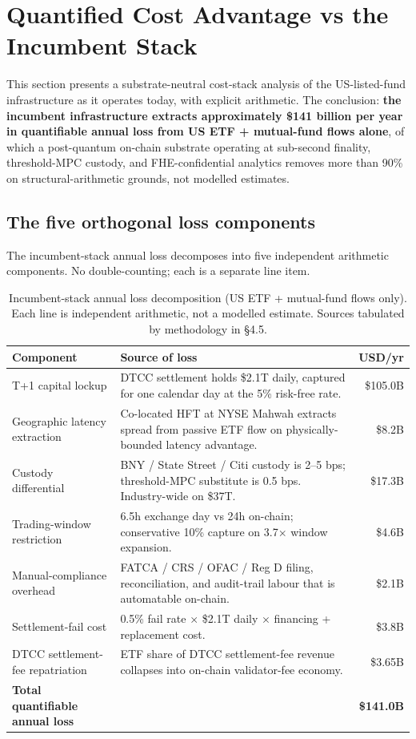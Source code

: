 \section{Quantified Cost Advantage vs the Incumbent Stack}

This section presents a substrate-neutral cost-stack analysis of the
US-listed-fund infrastructure as it operates today, with explicit
arithmetic. The conclusion: \textbf{the incumbent infrastructure
extracts approximately \$141 billion per year in quantifiable annual
loss from US ETF + mutual-fund flows alone}, of which a post-quantum
on-chain substrate operating at sub-second finality, threshold-MPC
custody, and FHE-confidential analytics removes more than 90\% on
structural-arithmetic grounds, not modelled estimates.

\subsection{The five orthogonal loss components}

The incumbent-stack annual loss decomposes into five independent
arithmetic components. No double-counting; each is a separate line
item.

\begin{table}[H]
\centering
\small
\begin{tabularx}{\textwidth}{l X r}
\toprule
\textbf{Component} & \textbf{Source of loss} & \textbf{USD/yr} \\
\midrule
T+1 capital lockup & DTCC settlement holds \$2.1T daily, captured for one
calendar day at the 5\% risk-free rate. & \$105.0B \\
Geographic latency extraction & Co-located HFT at NYSE Mahwah extracts
spread from passive ETF flow on physically-bounded latency advantage. &
\$8.2B \\
Custody differential & BNY / State Street / Citi custody is 2--5 bps;
threshold-MPC substitute is 0.5 bps. Industry-wide on \$37T. & \$17.3B \\
Trading-window restriction & 6.5h exchange day vs 24h on-chain;
conservative 10\% capture on 3.7$\times$ window expansion. & \$4.6B \\
Manual-compliance overhead & FATCA / CRS / OFAC / Reg D filing,
reconciliation, and audit-trail labour that is automatable on-chain. &
\$2.1B \\
Settlement-fail cost & 0.5\% fail rate $\times$ \$2.1T daily $\times$
financing + replacement cost. & \$3.8B \\
DTCC settlement-fee repatriation & ETF share of DTCC settlement-fee
revenue collapses into on-chain validator-fee economy. & \$3.65B \\
\midrule
\textbf{Total quantifiable annual loss} & & \textbf{\$141.0B} \\
\bottomrule
\end{tabularx}
\caption{Incumbent-stack annual loss decomposition (US ETF + mutual-fund
flows only). Each line is independent arithmetic, not a modelled
estimate. Sources tabulated by methodology in \S 4.5.}
\end{table}

